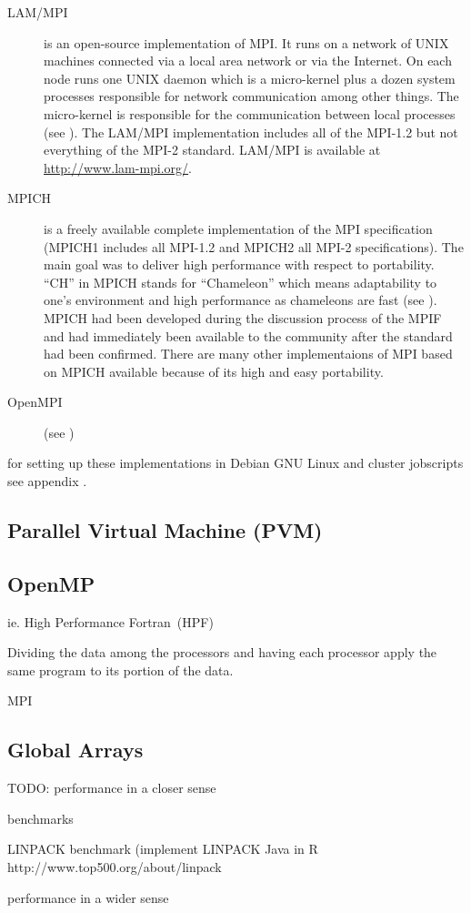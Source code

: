 \begin{description}
\item[LAM/MPI] is an open-source implementation of MPI. It runs on a
  network of UNIX machines connected via a local area network or via
  the Internet. On each node runs one UNIX daemon which is a
  micro-kernel plus a dozen system processes responsible for network
  communication among other things. The micro-kernel is
  responsible for the communication between local processes (see
  \cite{burns94lam}). The LAM/MPI implementation includes all of the
  MPI-1.2 but not everything of the MPI-2 standard. LAM/MPI is
  available at \url{http://www.lam-mpi.org/}.
\item[MPICH] is a freely available complete implementation of the MPI
  specification (MPICH1 includes all MPI-1.2 and MPICH2 all MPI-2
  specifications). The main goal was to deliver high performance with
  respect to portability. ``CH'' in MPICH stands for ``Chameleon''
  which means adaptability to one's environment and high performance
  as chameleons are fast (see \cite{gropp96mpich}). MPICH had been
  developed during the discussion process of the MPIF and had immediately been
  available to the community after the standard had been
  confirmed. There are many other implementaions of MPI based on MPICH
  available because of its high and easy portability.
\item[OpenMPI] (see \cite{gabriel04:_open_mpi}) 
\end{description}

for setting up these implementations in Debian GNU Linux and cluster
jobscripts see appendix \cite{app:mpi_imp}. 

\subsection{Parallel Virtual Machine (PVM)}
\label{PVM}



\subsection{OpenMP}
\label{OpenMP}



ie. High Performance Fortran~(HPF)

Dividing the data among the processors and having each processor apply
the same program to its portion of the data.

MPI

\subsection{Global Arrays}
\label{globalArrays}


TODO: performance in a closer sense

      benchmarks

      LINPACK benchmark (implement LINPACK Java in R
      http://www.top500.org/about/linpack

      performance in a wider sense
